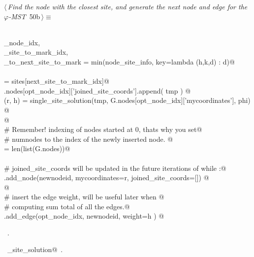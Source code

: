 \documentclass[11.5pt]{report}
\begin{document}
\needspace{3cm}
\vspace{-0.8cm} \newchunk
\begin{flushleft} \small
\begin{minipage}{\linewidth}\label{scrap77}\raggedright\small
{} $\langle\,${\itshape Find the node with the closest site, and generate the next node and edge for the $\varphi$-MST}\nobreak\ {\footnotesize {50b}}$\,\rangle\equiv$
\vspace{-1ex}
\begin{list}{}{} \item
\mbox{}\verb@@\\
\mbox{}\verb@opt_node_idx,          \@\\
\mbox{}\verb@next_site_to_mark_idx, \@\\
\mbox{}\verb@distance_to_next_site_to_mark = min(node_site_info, key=lambda (h,k,d) : d)@\\
\mbox{}\verb@@\\
\mbox{}\verb@tmp = sites[next_site_to_mark_idx]@\\
\mbox{}\verb@G.nodes[opt_node_idx]['joined_site_coords'].append(  tmp   ) @\\
\mbox{}\verb@(r, h) = single_site_solution(tmp, G.nodes[opt_node_idx]['mycoordinates'], phi) @\\
\mbox{}\verb@          @\\
\mbox{}\verb@# Remember! indexing of nodes started at 0, thats why you set@\\
\mbox{}\verb@# numnodes to the index of the newly inserted node. @\\
\mbox{}\verb@newnodeid = len(list(G.nodes))@\\
\mbox{}\verb@@\\
\mbox{}\verb@# joined_site_coords will be updated in the future iterations of while :@\\
\mbox{}\verb@G.add_node(newnodeid, mycoordinates=r, joined_site_coords=[]) @\\
\mbox{}\verb@  @\\
\mbox{}\verb@# insert the edge weight, will be useful later when @\\
\mbox{}\verb@# computing sum total of all the edges.@\\
\mbox{}\verb@G.add_edge(opt_node_idx, newnodeid, weight=h ) @\\
\mbox{}\verb@@{\NWsep}
\end{list}
\vspace{-1.5ex}
\footnotesize
\begin{list}{}{\setlength{\itemsep}{-\parsep}\setlength{\itemindent}{-\leftmargin}}
\item \NWtxtMacroRefIn\ .
\item \NWtxtIdentsUsed\nobreak\  \verb@single_site_solution@\nobreak\ .
\item{}
\end{list}
\end{minipage}\vspace{4ex}
\end{flushleft}
\end{document}
